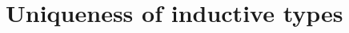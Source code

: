 \documentclass[hott-all.tex]{subfiles}
\begin{document}
\section{Uniqueness of inductive types}
% 
% 
% 
\end{document}
